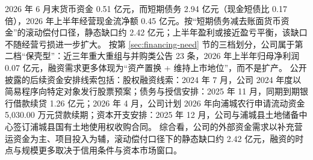  2026 年 6 月末货币资金 0.51 亿元，而短期债务 2.94 亿元（现金短债比 0.17 倍），2026 年上半年经营现金流净额 0.45 亿元。按“短期债务减去账面货币资金”的滚动偿付口径，静态缺口约 2.42 亿元；上半年盈利或接近盈亏平衡，该缺口不随经营亏损进一步扩大。 按第 \ref{sec:financing-need} 节的三档划分，公司属于第二档“保壳型”：近三年重大重组与并购类公告 23 条，2026 年上半年归母净利润 0.07 亿元，融资需求更多体现为“资产置换 + 维持上市地位”，而不是扩产。 公开披露的后续资金安排线索包括：股权融资线索：2024 年 7 月，公司 2024 年度以简易程序向特定对象发行股票预案；债务与授信安排：2025 年 11 月，同期到期银行借款续贷 1.26 亿元；2026 年 4 月，公司计划 2026 年向浦城农行申请流动资金 5,030.00 万元贷款续期；资本开支安排：2025 年 12 月，公司与浦城县土地储备中心签订浦城县国有土地使用权收购合同。 综合看，公司的外部资金需求以补充营运资金为主、项目投入为辅，滚动偿付口径下的静态缺口约 2.42 亿元，融资的时点与规模更多取决于信用条件与资本市场窗口。




